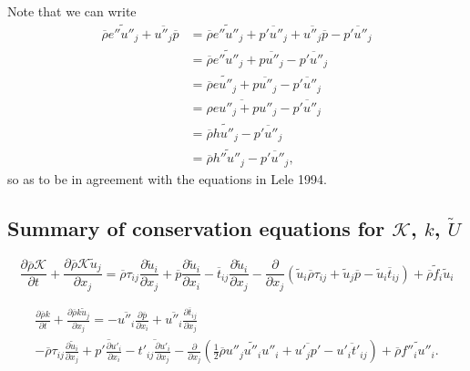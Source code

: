 \documentclass[oneside,a4paper,11pt]{report}
\newcommand{\rhoavg}{\overline{\rho}}
\newcommand{\pavg}{\overline{p}}
\newcommand{\tavg}{\overline{t}}
\newcommand{\pfluc}{p'}
\newcommand{\tfluc}{t'}
\newcommand{\ufluc}{u'}
\newcommand{\rs}{\tau}          %
\newcommand{\favgf}{\widetilde{f}}
\newcommand{\uavgf}{\widetilde{u}}
\newcommand{\eflucf}{e''}
\newcommand{\fflucf}{f''}
\newcommand{\Uavgf}{\widetilde{U}}
\newcommand{\uflucf}{u''}
\begin{document}
Note that we can write
\begin{align}
    \rhoavg \widetilde{ \eflucf \uflucf_j } + \overline{ \uflucf_j } \pavg &= \rhoavg \widetilde{ \eflucf \uflucf_j } + \overline{ \pfluc \uflucf_j } + \overline{ \uflucf_j } \pavg - \overline{ \pfluc \uflucf_j } \nonumber \\ 
    &= \rhoavg \widetilde{ \eflucf \uflucf_j } + \overline{ p \uflucf_j } - \overline{ \pfluc \uflucf_j } \nonumber \\
    &=  \rhoavg \widetilde{ e \uflucf_j} + \overline{ p \uflucf_j } - \overline{ \pfluc \uflucf_j } \nonumber \\
    &=\overline{ \rho e\uflucf_j + p\uflucf_j} - \overline{ \pfluc \uflucf_j } \nonumber \\
    &= \rhoavg \widetilde{ h \uflucf_j} - \overline{ \pfluc \uflucf_j } \nonumber \\
    &= \rhoavg \widetilde{ h'' \uflucf_j } - \overline{ \pfluc \uflucf_j } ,
\end{align}
so as to be in agreement with the equations in Lele 1994.

\subsection{Summary of conservation equations for $\mathcal{K}$, $k$, $\Uavgf$}
\begin{equation}
    \frac{ \partial \rhoavg \mathcal{K} }{ \partial t} + \frac{ \partial \rhoavg \mathcal{K} \uavgf_j }{ \partial x_j} = \rhoavg \rs_{ij} \frac{ \partial \uavgf_i }{ \partial x_j } + \pavg \frac{ \partial \uavgf_i }{ \partial x_i } - \tavg_{ij} \frac{ \partial \uavgf_i }{ \partial x_j } - \frac{\partial}{\partial x_j} \left ( \uavgf_i \rhoavg \rs_{ij} + \uavgf_j \pavg - \uavgf_i \tavg_{ij} \right ) + \rhoavg \favgf_i \uavgf_i
    \end{equation}

\begin{multline}
    \frac{ \partial \rhoavg k }{ \partial t}  + \frac{ \partial \rhoavg k \uavgf_j }{ \partial x_j } = - \overline{ \uflucf_i } \frac{ \partial \pavg }{ \partial x_i } + \overline{ \uflucf_i } \frac{ \partial \tavg_{ij} }{ \partial x_j } \\
    - \rhoavg \rs_{ij} \frac{ \partial \uavgf_i }{ \partial x_j}  + \overline{ \pfluc \frac{ \partial \ufluc_i } { \partial x_i } } - \overline{ \tfluc_{ij} \frac{ \partial \ufluc_i }{ \partial x_j } } - \frac{\partial}{ \partial x_j} \left ( \frac{1}{2} \rhoavg \widetilde{ \uflucf_j \uflucf_i \uflucf_i } + \overline{ \ufluc_j \pfluc }  - \overline{ \ufluc_i \tfluc_{ij} } \right ) + \rhoavg \widetilde{ \fflucf_i \uflucf_i }.
\end{multline}
\end{document}
